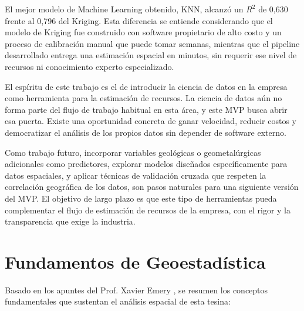 \documentclass[12pt,letterpaper]{article}
\begin{document}
	El mejor modelo de Machine Learning obtenido, KNN, alcanzó un $R^2$ de 0,630 
	frente al 0,796 del Kriging. Esta diferencia se entiende considerando que el 
	modelo de Kriging fue construido con software propietario de alto costo y un 
	proceso de calibración manual que puede tomar semanas, mientras que el pipeline 
	desarrollado entrega una estimación espacial en minutos, sin requerir ese nivel 
	de recursos ni conocimiento experto especializado.
	
	El espíritu de este trabajo es el de introducir la ciencia de datos en la 
	empresa como herramienta para la estimación de recursos. La ciencia de datos 
	aún no forma parte del flujo de trabajo habitual en esta área, y este MVP 
	busca abrir esa puerta. Existe una oportunidad concreta de ganar velocidad, 
	reducir costos y democratizar el análisis de los propios datos sin depender 
	de software externo.
	
	Como trabajo futuro, incorporar variables geológicas o geometalúrgicas 
	adicionales como predictores, explorar modelos diseñados específicamente para 
	datos espaciales, y aplicar técnicas de validación cruzada que respeten la 
	correlación geográfica de los datos, son pasos naturales para una siguiente 
	versión del MVP. El objetivo de largo plazo es que este tipo de herramientas 
	pueda complementar el flujo de estimación de recursos de la empresa, con el 
	rigor y la transparencia que exige la industria.
	
	\iffalse
	\newpage
	\appendix
	
	\section{Fundamentos de Geoestadística}
	
	Basado en los apuntes del Prof. Xavier Emery \cite{Emery2007}, se resumen los conceptos fundamentales que sustentan el análisis espacial de esta tesina:
	
\end{document}
